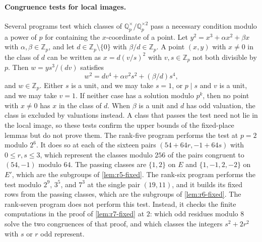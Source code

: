 \documentclass[12pt,oneside,openany]{book}
\theoremstyle{definition}
\theoremstyle{plain}
\numberwithin{equation}{chapter}
\theoremstyle{plain}
\theoremstyle{definition}
\theoremstyle{remark}
\newcommand{\Q}{\mathbb Q}
\newcommand{\Z}{\mathbb Z}
\newcommand{\sqgp}[1]{#1^{\times}/#1^{\times2}}
\begin{document}
\paragraph{Congruence tests for local images.} Several programs test which classes of $\sqgp{\Q_p}$ pass a necessary condition modulo a power of $p$ for containing the $x$-coordinate of a point. Let $y^2=x^3+\alpha x^2+\beta x$ with $\alpha,\beta\in\Z_p$, and let $d\in\Z_p\setminus\{0\}$ with $\beta/d\in\Z_p$. A point $(x,y)$ with $x\ne0$ in the class of $d$ can be written as $x=d(v/s)^2$ with $v,s\in\Z_p$ not both divisible by $p$. Then $w=ys^3/(dv)$ satisfies
\[
w^2=dv^4+\alpha v^2s^2+(\beta/d)s^4,
\]
and $w\in\Z_p$. Either $s$ is a unit, and we may take $s=1$, or $p\mid s$ and $v$ is a unit, and we may take $v=1$. If neither case has a solution modulo $p^k$, then no point with $x\ne0$ has $x$ in the class of $d$. When $\beta$ is a unit and $d$ has odd valuation, the class is excluded by valuations instead. A class that passes the test need not lie in the local image, so these tests confirm the upper bounds of the fixed-place lemmas but do not prove them. The rank-five program performs the test at $p=2$ modulo $2^6$. It does so at each of the sixteen pairs $(54+64r,-1+64s)$ with $0\le r,s\le3$, which represent the classes modulo $256$ of the pairs congruent to $(54,-1)$ modulo $64$. The passing classes are $\{1,2\}$ on $E$ and $\{1,-1,2,-2\}$ on $E'$, which are the subgroups of \cref{lem:r5-fixed}. The rank-six program performs the test modulo $2^9$, $3^5$, and $7^3$ at the single pair $(19,11)$, and it builds its fixed rows from the passing classes, which are the subgroups of \cref{lem:r6-fixed}. The rank-seven program does not perform this test. Instead, it checks the finite computations in the proof of \cref{lem:r7-fixed} at $2$: which odd residues modulo $8$ solve the two congruences of that proof, and which classes the integers $s^2+2r^2$ with $s$ or $r$ odd represent.
\end{document}
